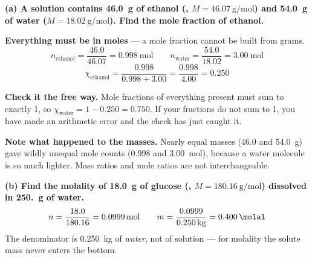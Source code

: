 \documentclass{apchem-worksheet}
\begin{document}
\begin{workedexample}
\textbf{(a) A solution contains \SI{46.0}{\gram} of ethanol
(, $M = \SI{46.07}{\gram\per\mole}$) and \SI{54.0}{\gram}
of water ($M = \SI{18.02}{\gram\per\mole}$). Find the mole fraction of
ethanol.}

\textbf{Everything must be in moles} --- a mole fraction cannot be built
from grams.
\[ n_{\text{ethanol}} = \frac{46.0}{46.07} = \SI{0.998}{\mole}
   \qquad
   n_{\text{water}} = \frac{54.0}{18.02} = \SI{3.00}{\mole} \]
\[ \chi_{\text{ethanol}}
   = \frac{0.998}{0.998 + 3.00}
   = \frac{0.998}{4.00}
   = \mathbf{0.250} \]

\textbf{Check it the free way.} Mole fractions of everything present
must sum to exactly 1, so $\chi_{\text{water}} = 1 - 0.250 = 0.750$.
If your fractions do not sum to 1, you have made an arithmetic error and
the check has just caught it.

\textbf{Note what happened to the masses.} Nearly equal masses
(\SI{46.0}{} and \SI{54.0}{\gram}) gave wildly unequal mole counts
(\SI{0.998}{} and \SI{3.00}{\mole}), because a water molecule is so much
lighter. Mass ratios and mole ratios are not interchangeable.

\textbf{(b) Find the molality of \SI{18.0}{\gram} of glucose
(, $M = \SI{180.16}{\gram\per\mole}$) dissolved in
\SI{250.}{\gram} of water.}
\[ n = \frac{18.0}{180.16} = \SI{0.0999}{\mole}
   \qquad
   m = \frac{0.0999}{\SI{0.250}{\kilo\gram}}
     = \mathbf{\SI{0.400}{\molal}} \]
The denominator is \SI{0.250}{\kilo\gram} of \emph{water}, not of
solution --- for molality the solute mass never enters the bottom.
\end{workedexample}
\end{document}
